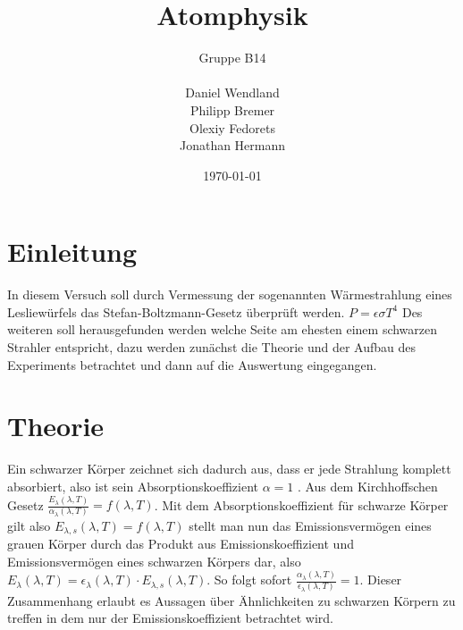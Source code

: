 \documentclass[a4paper, 11pt]{article}
\begin{document}
\title{Atomphysik}
\author{Gruppe B14 \\ \\ Daniel Wendland \\ Philipp Bremer \\ Olexiy Fedorets \\ Jonathan Hermann}
\date{\today}
\maketitle

\newpage

\tableofcontents
\newpage


\section{Einleitung}
In diesem Versuch soll durch Vermessung der sogenannten Wärmestrahlung eines Lesliewürfels das Stefan-Boltzmann-Gesetz überprüft werden.
\newline
$P=\epsilon \sigma T^4$
\newline
Des weiteren soll herausgefunden werden welche Seite am ehesten einem schwarzen Strahler entspricht, dazu werden zunächst die Theorie und der Aufbau des Experiments betrachtet und dann auf die Auswertung eingegangen.

\section{Theorie}
Ein schwarzer Körper zeichnet sich dadurch aus, dass er jede Strahlung komplett absorbiert, also ist sein Absorptionskoeffizient $\alpha=1$ . Aus dem Kirchhoffschen Gesetz $\frac{E_{\lambda}(\lambda,T)}{\alpha_{\lambda}(\lambda,T)}=f(\lambda,T)$. Mit dem Absorptionskoeffizient für schwarze Körper gilt also $E_{\lambda,s}(\lambda,T)=f(\lambda,T)$ stellt man nun das Emissionsvermögen eines grauen Körper durch das Produkt aus Emissionskoeffizient und Emissionsvermögen eines schwarzen Körpers dar, also $E_{\lambda}(\lambda,T)=\epsilon_{\lambda}(\lambda, T) \cdot E_{\lambda,s}(\lambda,T)$. So folgt sofort $\frac{\alpha_{\lambda}(\lambda, T)}{\epsilon_{\lambda}(\lambda, T)}=1$. Dieser Zusammenhang erlaubt es Aussagen über Ähnlichkeiten zu schwarzen Körpern zu treffen in dem nur der Emissionskoeffizient betrachtet wird.
\end{document}
